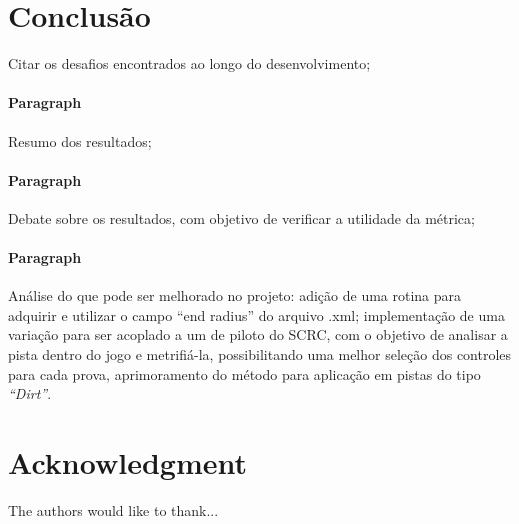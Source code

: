 \documentclass[conference]{IEEEtran}
\begin{document}




\section{Conclusão}
  Citar os desafios encontrados ao longo do desenvolvimento;
  \paragraph{Paragraph}
  Resumo dos resultados;
  \paragraph{Paragraph}
  Debate sobre os resultados, com objetivo de verificar a utilidade da métrica;
  \paragraph{Paragraph}
  Análise do que pode ser melhorado no projeto: adição de uma rotina para adquirir e utilizar o campo ``end radius'' do arquivo .xml; implementação de uma variação para ser acoplado a um de piloto do SCRC, com o objetivo de analisar a pista dentro do jogo e metrifiá-la, possibilitando uma melhor seleção dos controles para cada prova, aprimoramento do método para aplicação em pistas do tipo \textit{``Dirt''}.






\section*{Acknowledgment}


The authors would like to thank...





\end{document}
